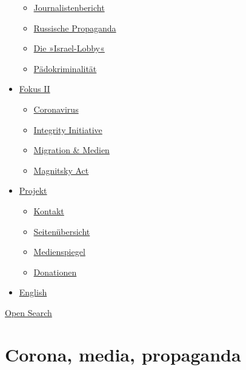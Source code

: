 \begin{itemize}
  \begin{itemize}
  \tightlist
  \item
    \href{https://swprs.org/bericht-eines-journalisten/}{Journalistenbericht}
  \item
    \href{https://swprs.org/russische-propaganda/}{Russische Propaganda}
  \item
    \href{https://swprs.org/die-israel-lobby-fakten-und-mythen/}{Die
    »Israel-Lobby«}
  \item
    \href{https://swprs.org/geopolitik-und-paedokriminalitaet/}{Pädokriminalität}
  \end{itemize}
\item
  \href{https://swprs.org/migration-und-medien/}{Fokus II}

  \begin{itemize}
  \tightlist
  \item
    \href{https://swprs.org/covid-19-hinweis-ii/}{Coronavirus}
  \item
    \href{https://swprs.org/die-integrity-initiative/}{Integrity
    Initiative}
  \item
    \href{https://swprs.org/migration-und-medien/}{Migration \& Medien}
  \item
    \href{https://swprs.org/der-fall-magnitsky/}{Magnitsky Act}
  \end{itemize}
\item
  \href{https://swprs.org/kontakt/}{Projekt}

  \begin{itemize}
  \tightlist
  \item
    \href{https://swprs.org/kontakt/}{Kontakt}
  \item
    \href{https://swprs.org/uebersicht/}{Seitenübersicht}
  \item
    \href{https://swprs.org/medienspiegel/}{Medienspiegel}
  \item
    \href{https://swprs.org/donationen/}{Donationen}
  \end{itemize}
\item
  \href{https://swprs.org/contact/}{English}
\end{itemize}

\protect\hyperlink{}{Open Search}

\hypertarget{corona-media-propaganda}{%
\section{Corona, media, propaganda}\label{corona-media-propaganda}}

